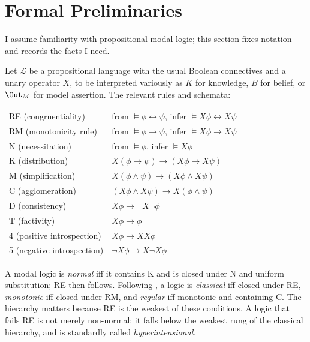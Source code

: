 \section{Formal Preliminaries}
\label{sec:preliminaries}

I assume familiarity with propositional modal logic; this section fixes notation
and records the facts I need.

Let $\mathcal{L}$ be a propositional language with the usual Boolean connectives
and a unary operator $X$, to be interpreted variously as $K$ for knowledge, $B$
for belief, or $\Out_M$ for model assertion. The relevant rules and schemata:

\begin{center}
\begin{tabular}{@{}ll@{}}
\toprule
RE (congruentiality) & from $\models \phi \leftrightarrow \psi$, infer $\models X\phi \leftrightarrow X\psi$ \\
RM (monotonicity rule) & from $\models \phi \rightarrow \psi$, infer $\models X\phi \rightarrow X\psi$ \\
N (necessitation) & from $\models \phi$, infer $\models X\phi$ \\
K (distribution) & $X(\phi \rightarrow \psi) \rightarrow (X\phi \rightarrow X\psi)$ \\
M (simplification) & $X(\phi \wedge \psi) \rightarrow (X\phi \wedge X\psi)$ \\
C (agglomeration) & $(X\phi \wedge X\psi) \rightarrow X(\phi \wedge \psi)$ \\
D (consistency) & $X\phi \rightarrow \neg X \neg \phi$ \\
T (factivity) & $X\phi \rightarrow \phi$ \\
4 (positive introspection) & $X\phi \rightarrow XX\phi$ \\
5 (negative introspection) & $\neg X\phi \rightarrow X \neg X\phi$ \\
\bottomrule
\end{tabular}
\end{center}

A modal logic is \emph{normal} iff it contains K and is closed under N and
uniform substitution; RE then follows. Following \citet{chellas1980}, a logic is
\emph{classical} iff closed under RE, \emph{monotonic} iff closed under RM, and
\emph{regular} iff monotonic and containing C. The hierarchy matters because RE
is the weakest of these conditions. A logic that fails RE is not merely
non-normal; it falls below the weakest rung of the classical hierarchy, and is
standardly called \emph{hyperintensional}.

